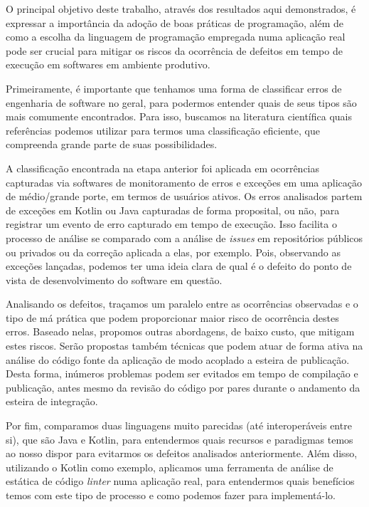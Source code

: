 O principal objetivo deste trabalho, através dos resultados aqui demonstrados, é expressar a importância da adoção de boas práticas de programação, além de como a escolha da linguagem de programação empregada numa aplicação real pode ser crucial para mitigar os riscos da ocorrência de defeitos em tempo de execução em softwares em ambiente produtivo.

Primeiramente, é importante que tenhamos uma forma de classificar erros de engenharia de software no geral, para podermos entender quais de seus tipos são mais comumente encontrados. Para isso, buscamos na literatura científica quais referências podemos utilizar para termos uma classificação eficiente, que compreenda grande parte de suas possibilidades.

A classificação encontrada na etapa anterior foi aplicada em ocorrências capturadas via softwares de monitoramento de erros e exceções em uma aplicação de médio/grande porte, em termos de usuários ativos. Os erros analisados partem de exceções em Kotlin ou Java capturadas de forma proposital, ou não, para registrar um evento de erro capturado em tempo de execução. Isso facilita o processo de análise se comparado com a análise de \textit{issues} em repositórios públicos ou privados ou da correção aplicada a elas, por exemplo. Pois, observando as exceções lançadas, podemos ter uma ideia clara de qual é o defeito do ponto de vista de desenvolvimento do software em questão.

Analisando os defeitos, traçamos um paralelo entre as ocorrências observadas e o tipo de má prática que podem proporcionar maior risco de ocorrência destes erros. Baseado nelas, propomos outras abordagens, de baixo custo, que mitigam estes riscos. Serão propostas também técnicas que podem atuar de forma ativa na análise do código fonte da aplicação de modo acoplado a esteira de publicação. Desta forma, inúmeros problemas podem ser evitados em tempo de compilação e publicação, antes mesmo da revisão do código por pares durante o andamento da esteira de integração.

Por fim, comparamos duas linguagens muito parecidas (até interoperáveis entre si), que são Java e Kotlin, para entendermos quais recursos e paradigmas temos ao nosso dispor para evitarmos os defeitos analisados anteriormente. Além disso, utilizando o Kotlin como exemplo, aplicamos uma ferramenta de análise de estática de código \textit{linter} numa aplicação real, para entendermos quais benefícios temos com este tipo de processo e como podemos fazer para implementá-lo.


